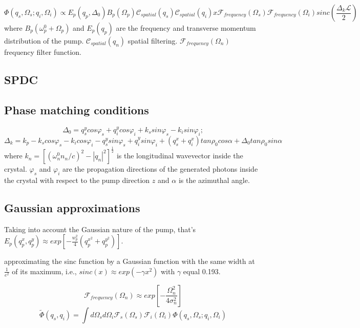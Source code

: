 \begin{equation}
\Phi(q_s,\Omega_s;q_i,\Omega_i) \propto E_p(q_p,\Delta_0) B_p(\Omega_p) \mathcal{C}_{spatial}(q_s) \mathcal{C}_{spatial}(q_i) 
 x \mathcal{F}_{frequency}(\Omega_s) \mathcal{F}_{frequency}(\Omega_i) sinc \left( \frac{\Delta_k \mathcal{L}}{2} \right)
\end{equation}
where $B_p(\omega^0_p+\Omega_p)$ and $E_p(q_p)$ are the frequency and transverse momentum distribution of the pump. $\mathcal{C}_{spatial}(q_n)$ spatial filtering. $\mathcal{F}_{frequency}(\Omega_n)$ frequency filter function.


\subsection{SPDC}

\subsection{Phase matching conditions}
\begin{equation}
\Delta_0 = q^y_s cos \varphi_s + q^y_i cos \varphi_i + k_s sin \varphi_s - k_i sin \varphi_i ;
\end{equation}
\begin{equation}
\Delta_k = k_p - k_s cos \varphi_s - k_i cos \varphi_i - q^y_s sin \varphi_s + q^y_i sin \varphi_i 
+ (q^x_s + q^x_i ) tan \rho_0 cos \alpha + \Delta_0 tan \rho_0 sin \alpha 
\end{equation}
where $k_n=[(\omega^0_n n_n / c )^2 - |q_n|^2]^{\frac{1}{2}}$ is the longitudinal wavevector inside the crystal. $\varphi_s$ and $\varphi_i$ are the propagation directions of the generated photons inside the crystal with respect to the pump direction $z$ and $\alpha$ is the azimuthal angle.

\subsection{Gaussian approximations}

Taking into account the Gaussian nature of the pump, that's $E_p(q^x_p , q^y_p ) \approx exp \left[ -\frac{w_p^2}{4}(q^{x^2}_p + q^{y^2}_p )\right]$.

approximating the sinc function by a Gaussian function with the same width at $\frac{1}{e^2}$ of its maximum, i.e., $sinc(x)\approx exp(- \gamma x^2)$  with $\gamma$ equal 0.193. 

\begin{equation}
\mathcal{F}_{frequency}(\Omega_n) \approx exp \left[-\frac{ \Omega^2_n}{4 \sigma^2_n} \right] 
\end{equation}
\begin{equation}
\tilde{\Phi}(q_s,q_i)=\int d\Omega_s d\Omega_i \mathcal{F}_s (\Omega_s) \mathcal{F}_i (\Omega_i) \Phi(q_s,\Omega_s;q_i,\Omega_i)
\end{equation}

